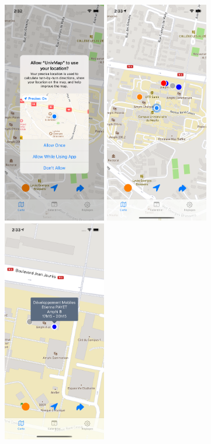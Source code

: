 \documentclass{article}
\begin{document}
\vspace{10pt}   %

\begin{center}
    \includegraphics[width=45mm, scale=0.5]{allowUserLocation.png}
    \includegraphics[width=45mm, scale=0.5]{map.png}
    \includegraphics[width=45mm, scale=0.5]{point_bleu.png}
\end{center}
\end{document}
